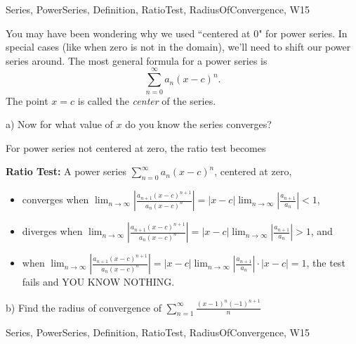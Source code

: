  

\begin{tagblock}{Series, PowerSeries, Definition, RatioTest, RadiusOfConvergence, W15}
\begin{question}

You may have been wondering why we used ``centered at 0" for power series. In special cases (like when zero is not in the domain), we'll need to shift our power series around. The most general formula for a power series is 
\[
\displaystyle\sum_{n=0}^{\infty}a_n(x-c)^n.
\]
The point $x=c$ is called the \textit{center} of the series. 

\bigskip

a) Now for what value of $x$ do you know the series converges?

\bigskip

For power series not centered at zero, the ratio test becomes

\bigskip

\noindent\textbf{Ratio Test:} A power series $\displaystyle\sum_{n=0}^{\infty}a_n(x-c)^n$, centered at zero,
\begin{itemize}
\item converges when $\displaystyle\lim_{n\to\infty}\left|\frac{a_{n+1}(x-c)^{n+1}}{a_n(x-c)^n}\right|=|x-c|\lim_{n\to\infty}\left|\frac{a_{n+1}}{a_n}\right|<1$,
\item diverges when $\displaystyle\lim_{n\to\infty}\left|\frac{a_{n+1}(x-c)^{n+1}}{a_n(x-c)^n}\right|=|x-c|\lim_{n\to\infty}\left|\frac{a_{n+1}}{a_n}\right|>1$, and
\item when $\displaystyle\lim_{n\to\infty}\left|\frac{a_{n+1}(x-c)^{n+1}}{a_n(x-c)^n}\right|=|x-c|\lim_{n\to\infty}\left|\frac{a_{n+1}}{a_n}\right|\cdot |x-c|=1$, the test fails and YOU KNOW NOTHING. 
\end{itemize}

\bigskip

b) Find the radius of convergence of $\displaystyle\sum_{n=1}^{\infty}\frac{(x-1)^n(-1)^{n+1}}{n}$
	
	
\begin{tags}
	    Series, PowerSeries, Definition, RatioTest, RadiusOfConvergence, W15
\end{tags}
	
\begin{diary}
	    
\end{diary}
	
\begin{solution}
	   
\end{solution}
	
\end{question}

\end{tagblock}

